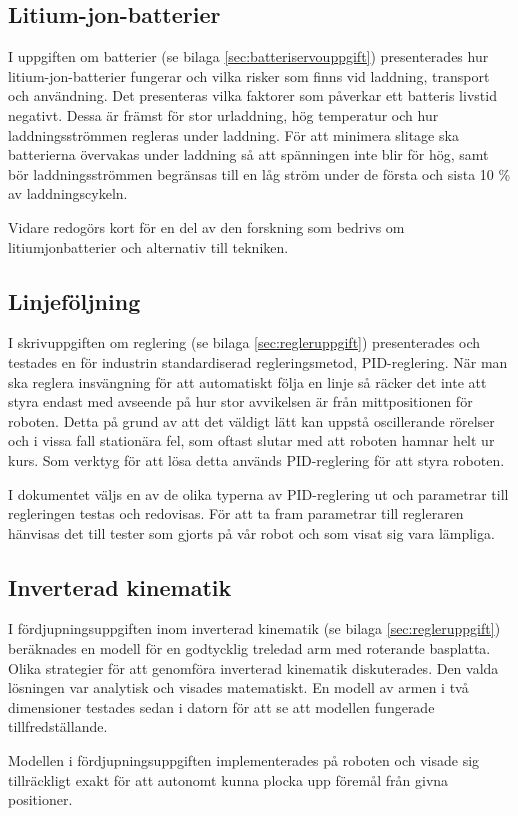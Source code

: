 \subsection{Litium-jon-batterier}

I uppgiften om batterier (se bilaga \ref{sec:batteriservouppgift}) presenterades hur litium-jon-batterier fungerar och vilka risker som finns vid laddning, transport och användning. Det presenteras vilka faktorer som påverkar ett batteris livstid negativt. Dessa är främst för stor urladdning, hög temperatur och hur laddningsströmmen regleras under laddning. För att minimera slitage ska batterierna övervakas under laddning så att spänningen inte blir för hög, samt bör laddningsströmmen begränsas till en låg ström under de första och sista 10 \% av laddningscykeln.

Vidare redogörs kort för en del av den forskning som bedrivs om litiumjonbatterier och alternativ till tekniken.

\subsection{Linjeföljning}

I skrivuppgiften om reglering (se bilaga \ref{sec:regleruppgift}) presenterades och testades en för industrin standardiserad regleringsmetod, PID-reglering. När man ska reglera insvängning för att automatiskt följa en linje så räcker det inte att styra endast med avseende på hur stor avvikelsen är från mittpositionen för roboten. Detta på grund av att det väldigt lätt kan uppstå oscillerande rörelser och i vissa fall stationära fel, som oftast slutar med att roboten hamnar helt ur kurs. Som verktyg för att lösa detta används PID-reglering för att styra roboten.

I dokumentet väljs en av de olika typerna av PID-reglering ut och parametrar till regleringen testas och redovisas. För att ta fram parametrar till regleraren hänvisas det till tester som gjorts på vår robot och som visat sig vara lämpliga.

\subsection{Inverterad kinematik}
I fördjupningsuppgiften inom inverterad kinematik (se bilaga \ref{sec:regleruppgift}) beräknades en modell för en godtycklig treledad arm med roterande basplatta. Olika strategier för att genomföra inverterad kinematik diskuterades. Den valda lösningen var analytisk och visades matematiskt. En modell av armen i två dimensioner testades sedan i datorn för att se att modellen fungerade tillfredställande.

Modellen i fördjupningsuppgiften implementerades på roboten och visade sig tillräckligt exakt för att autonomt kunna plocka upp föremål från givna positioner.